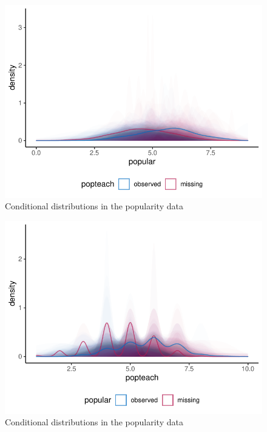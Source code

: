 \documentclass[
]{jss}
\begin{document}
\begin{CodeChunk}
\begin{figure}

{\centering \includegraphics{Manuscript_files/figure-latex/pop_dist-1} 

}

\caption[Conditional distributions in the popularity data]{Conditional distributions in the popularity data}\label{fig:pop_dist-1}
\end{figure}
\begin{figure}

{\centering \includegraphics{Manuscript_files/figure-latex/pop_dist-2} 

}

\caption[Conditional distributions in the popularity data]{Conditional distributions in the popularity data}\label{fig:pop_dist-2}
\end{figure}
\end{CodeChunk}
\end{document}
